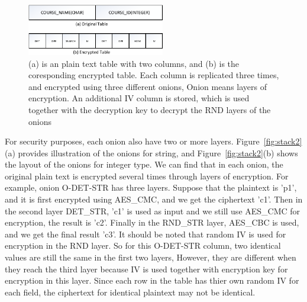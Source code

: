 

\begin{figure}[tb]
\centering
\includegraphics[width=6cm]{images/extend.pdf}
\caption{(a) is an plain text table with two columns, and (b) is the coresponding encrypted table. Each column is replicated three times, and encrypted using three different onions, Onion means layers of encryption. An additional IV column is stored, which is used together with the decryption key to decrypt the RND layers of the onions}
\label{fig:stackx}
\end{figure}

For security purposes, each onion also have two or more layers. Figure~\ref{fig:stack2}(a) provides illustration of the onions for string, and Figure~\ref{fig:stack2}(b) shows the layout of the onions for integer type. We can find that in each onion, the original plain text is encrypted several times through layers of encryption. For example, onion O-DET-STR has three layers. Suppose that the plaintext is 'p1', and it is first encrypted using AES\_CMC, and we get the ciphertext 'c1'. Then in the second layer DET\_STR, 'c1' is used as input and we still use AES\_CMC for encryption, the result is 'c2'. Finally in the RND\_STR layer, AES\_CBC is used, and we get the final result 'c3'. It should be noted that random IV is used for encryption in the RND layer. So for this O-DET-STR column, two identical values are still the same in the first two layers, However, they are different when they reach the third layer because IV is used together with encryption key for encryption in this layer. Since each row in the table has thier own random IV for each field, the ciphertext for identical plaintext may not be identical. 

